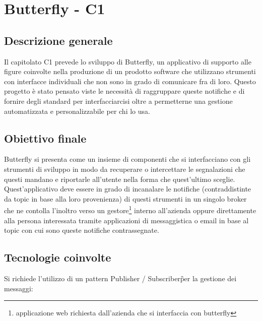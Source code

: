 \section{Butterfly - C1} \label{c1}
    \subsection{Descrizione generale}
	Il capitolato C1 prevede lo sviluppo di Butterfly, un applicativo di supporto alle figure coinvolte nella produzione di un prodotto software che utilizzano strumenti con interfacce individuali che non sono in grado di comunicare fra di loro.
	Questo progetto è stato pensato viste le necessità di raggruppare queste notifiche e di fornire degli standard per interfacciarcisi oltre a permetterne una gestione automatizzata e personalizzabile per chi lo usa.

    \subsection{Obiettivo finale}
    Butterfly si presenta come un insieme di componenti che si interfacciano con gli strumenti di sviluppo in modo da recuperare o intercettare le segnalazioni che questi mandano e riportarle all'utente nella forma che quest'ultimo sceglie.\\
    Quest'applicativo deve essere in grado di incanalare le notifiche (contraddistinte da topic in base alla loro provenienza) di questi strumenti in un singolo broker che ne contolla l'inoltro verso un gestore\footnote{applicazione web richiesta dall'azienda che si interfaccia con butterfly} interno all'azienda oppure direttamente alla persona interessata tramite applicazioni di messaggistica o email in base al topic con cui sono queste notifiche contrassegnate.

    \subsection{Tecnologie coinvolte}
	Si richiede l'utilizzo di un pattern Publisher / Subscriber\G per la gestione dei messaggi:


